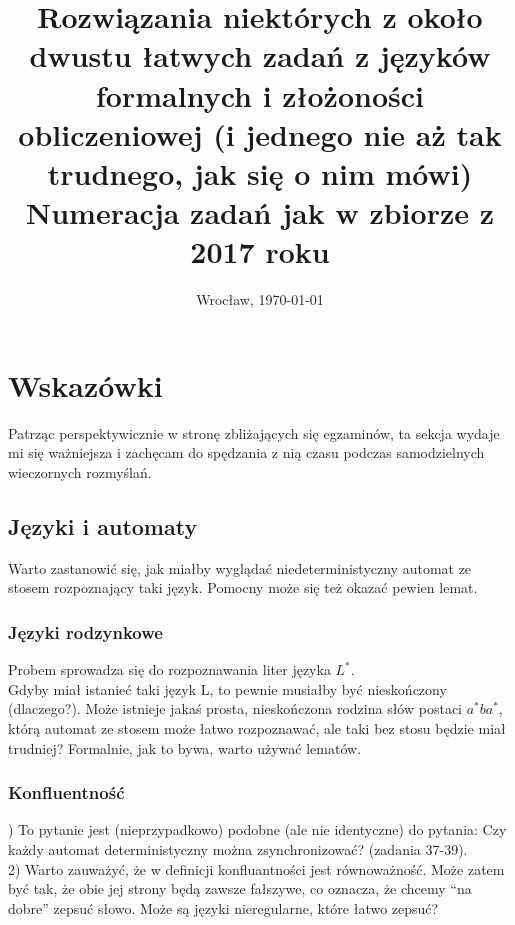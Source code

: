 \documentclass[a4paper,11pt]{article}
\date{Wrocław, \today}
\title{\LARGE{\textbf{Rozwiązania niektórych z około dwustu łatwych zadań z języków formalnych i złożoności obliczeniowej 
(i jednego nie aż tak trudnego, jak się o nim mówi)}\\\Large{Numeracja zadań jak w zbiorze z 2017 roku}}}
\author{}
\newenvironment{zadanie}[1]
  {\renewcommand\theinnercustomthm{#1}\innercustomthm}
  {\endinnercustomthm}
\begin{document}
\maketitle


\section{Wskazówki}

Patrząc perspektywicznie w stronę zbliżających się egzaminów, ta sekcja wydaje mi się ważniejsza i zachęcam do spędzania z nią
czasu podczas samodzielnych wieczornych rozmyślań.

\subsection{Języki i automaty}

\begin{zadanie}{63}
Warto zastanowić się, jak miałby wyglądać niedeterministyczny automat ze stosem rozpoznający taki język. Pomocny może się też
okazać pewien lemat.
\end{zadanie}

\subsubsection{Języki rodzynkowe}

\begin{zadanie}{71}
Probem sprowadza się do rozpoznawania liter języka $L^*$. \\
Gdyby miał istanieć taki język L, to pewnie musiałby być nieskończony (dlaczego?). Może istnieje jakaś prosta, nieskończona
rodzina słów postaci $a^*ba^*$, którą automat ze stosem może łatwo rozpoznawać, ale taki bez stosu będzie miał trudniej?
Formalnie, jak to bywa, warto używać lematów.
\end{zadanie}

\subsubsection{Konfluentność}

\begin{zadanie}{74}
1) To pytanie jest (nieprzypadkowo) podobne (ale nie identyczne) do pytania: Czy każdy automat deterministyczny można 
zsynchronizować? (zadania 37-39). \\
2) Warto zauważyć, że w definicji konfluantności jest równoważność. Może zatem być tak, że obie jej strony będą zawsze fałszywe,
co oznacza, że chcemy ``na dobre'' zepsuć słowo. Może są języki nieregularne, które łatwo zepsuć?
\end{zadanie}
\end{document}
